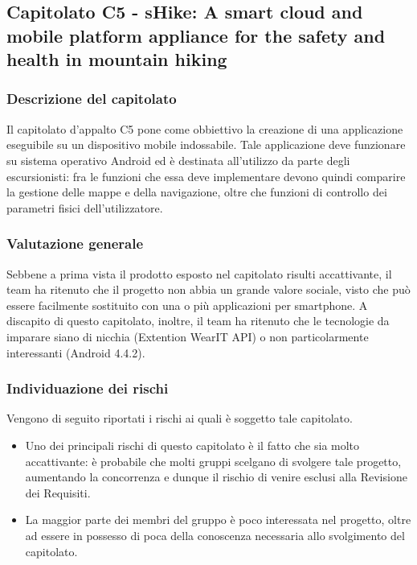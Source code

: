 	\subsection{Capitolato C5 - sHike: A smart cloud and mobile platform appliance for the safety and health in mountain hiking}
		\subsubsection{Descrizione del capitolato}
			Il capitolato d'appalto C5 pone come obbiettivo la creazione di una applicazione eseguibile su un dispositivo mobile indossabile. Tale applicazione deve funzionare su sistema operativo Android ed è destinata all'utilizzo da parte degli escursionisti: fra le funzioni che essa deve implementare devono quindi comparire la gestione delle mappe e della navigazione, oltre che funzioni di controllo dei parametri fisici dell'utilizzatore.
		\subsubsection{Valutazione generale}
		Sebbene a prima vista il prodotto esposto nel capitolato risulti accattivante, il team ha ritenuto che il progetto non abbia un grande valore sociale, visto che può essere facilmente sostituito con una o più applicazioni per smartphone. A discapito di questo capitolato, inoltre, il team ha ritenuto che le tecnologie da imparare siano di nicchia (Extention WearIT API) o non particolarmente interessanti (Android 4.4.2).
		\subsubsection{Individuazione dei rischi}
			Vengono di seguito riportati i rischi ai quali è soggetto tale capitolato.
			\begin{itemize}
				\item Uno dei principali rischi di questo capitolato è il fatto che sia molto accattivante: è probabile che molti gruppi scelgano di svolgere tale progetto, aumentando la concorrenza e dunque il rischio di venire esclusi alla Revisione dei Requisiti.
				\item La maggior parte dei membri del gruppo è poco interessata nel progetto, oltre ad essere in possesso di poca della conoscenza necessaria allo svolgimento del capitolato.
			\end{itemize}
